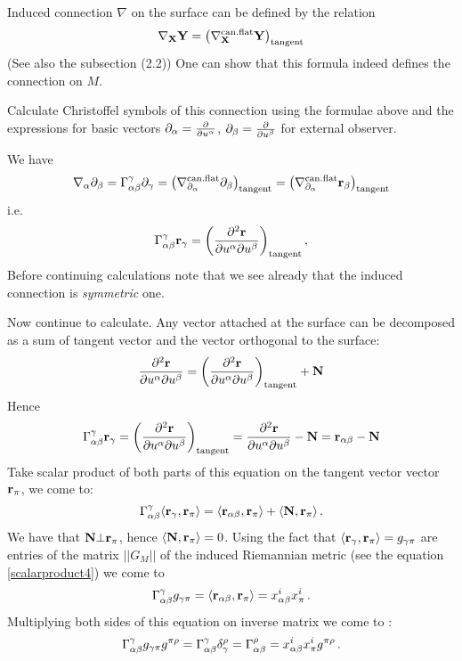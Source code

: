 \documentclass[12pt]{article}
\theoremstyle{theorem}
\numberwithin{equation}{section}
\begin{document}
{   Induced connection $\nabla$ on the surface can be defined by the relation
             \begin{equation}\label{inducedconnection4}
             {\nabla}_{\bf X}{\bf Y}=\left( \nabla^{\rm can.flat}_{\bf X} {\bf Y}\right)_{\rm tangent}
             \end{equation}
          (See also the subsection (2.2))
One can show that this formula indeed defines the connection on $M$.


Calculate Christoffel symbols of this connection using the formulae above and the expressions
for basic vectors $\partial_\alpha={\partial\over \partial u^\alpha}$,  $\partial_\beta={\partial\over \partial u^\beta}$ for external observer.

We have
\begin{equation}\label{christoffelsymbols1forinducedconnection}
\nabla_\alpha\partial_\beta=\Gamma^\gamma_{\alpha\beta}\partial_\gamma=
\left( \nabla^{\rm can.flat}_{\partial_\alpha} {\partial_\beta}\right)_{\rm tangent}=
\left( \nabla^{\rm can.flat}_{\partial_\alpha} {{\bf r}_\beta}\right)_{\rm tangent}
\end{equation}
i.e.
\begin{equation}\label{christoffelsymbols1forinducedconnection2}
 \Gamma^\gamma_{\alpha\beta}{\bf r}_\gamma=\left({\partial^2{\bf r} \over \partial u^\alpha\partial u^\beta}\right)_{\rm tangent},
\end{equation}
Before continuing calculations note that we see already that the induced connection is {\it symmetric} one.

Now continue to calculate. Any vector attached at the surface can be decomposed as a sum of tangent vector and the vector orthogonal to the surface:
               $$
           {\partial^2{\bf r} \over \partial u^\alpha\partial u^\beta}=\left({\partial^2{\bf r} \over \partial u^\alpha\partial u^\beta}\right)_{\rm tangent}+{\bf N}
               $$
 Hence
 \begin{equation}\label{christoffelsymbols1forinducedconnection4}
 \Gamma^\gamma_{\alpha\beta}{\bf r}_\gamma=\left({\partial^2{\bf r} \over \partial u^\alpha\partial u^\beta}\right)_{\rm tangent}=
 {\partial^2{\bf r} \over \partial u^\alpha\partial u^\beta}-{\bf N}= {\bf r}_{\alpha\beta}-{\bf N}
\end{equation}
Take scalar product of  both parts of this equation on the tangent vector vector ${\bf r}_\pi$, we come to:
            $$
         \Gamma^\gamma_{\alpha\beta}\langle{\bf r}_\gamma, {\bf r}_\pi\rangle=
         \langle{\bf r}_{\alpha\beta},{\bf r}_\pi\rangle+\langle{\bf N},{\bf r}_\pi\rangle\,.
            $$
We have that ${\bf N}\bot {\bf r}_\pi$, hence $\langle{\bf N},{\bf r}_\pi\rangle=0$. Using the fact that
$\langle{\bf r}_\gamma, {\bf r}_\pi\rangle=g_{\gamma\pi}$ are entries of the matrix $||G_M||$ of the induced Riemannian metric
(see the equation \eqref{scalarproduct4}) we come to
               $$
\Gamma^\gamma_{\alpha\beta}g_{\gamma\pi}=\langle{\bf r}_{\alpha\beta},{\bf r}_\pi\rangle=x^i_{\alpha\beta}x^i_\pi\,.
               $$
Multiplying both sides of this equation on inverse matrix we come to :
               $$
\Gamma^\gamma_{\alpha\beta}g_{\gamma\pi}g^{\pi\rho}=\Gamma^\gamma_{\alpha\beta}\delta_\gamma^\rho=
\Gamma^\rho_{\alpha\beta}=x^i_{\alpha\beta}x^i_\pi g^{\pi\rho}\,.
               $$

}
\end{document}
